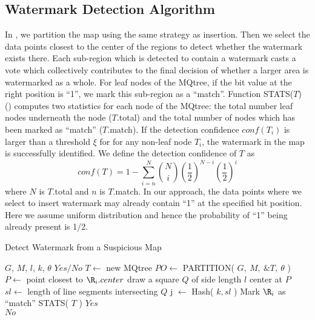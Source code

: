 \subsection{Watermark Detection Algorithm}

In , we partition the map %
using the same strategy as insertion. Then we select the data points closest
to the center of the regions to detect whether the watermark exists there.
Each sub-region which is detected to contain a watermark casts a vote
which collectively contributes to the final decision of whether a larger
area is watermarked as a whole.
For leaf nodes of the MQtree, if the bit value at the right position is ``1'', we mark 
this sub-region as a ``match''. 
Function STATS($T$) () computes two statistics for
each node of the MQtree: the total number leaf nodes underneath the node ($T$.total)
and the total number of nodes which has been marked as ``match'' ($T$.match).
If the detection confidence $conf(T_i)$ is larger than a threshold $\xi$ for
for any non-leaf node $T_i$, the watermark in the map is successfully identified.
We define the detection confidence of $T$ as
\begin{equation} \label{eqn:conf}
conf (T) =1 - \sum _{ i=n }^N{N \choose i}\left(\frac{1}{2}\right)^{ N-i} 
\left(\frac{1}{2}\right)^i 
\end{equation}
where $N$ is $T$.total and $n$ is $T$.match. 
In our approach, the data points where we select to insert watermark may
already contain ``1'' at the specified bit position. Here we assume uniform
distribution and hence the probability of ``1'' being already present is
1/2.
 
\begin{algorithm}[th]
\caption{Detect Watermark from a Suspicious Map}
\label{algo:Detection}
\begin{algorithmic}[1]
\Require $G$, $M$, $l$, $k$, $\theta$
\Ensure $Yes/No$
\State $T \leftarrow$ new MQtree
\State $PO \leftarrow$ PARTITION( $G,~M,~\&T,~\theta$ )
\State $P\leftarrow$ point closest to ${\R}_{i}.center$
\State draw a square $Q$ of side length $l$ center at $P$
\State $sl \leftarrow$ length of line segments intersecting $Q$
\State j $\leftarrow$ Hash( $k,sl$ )
\State Mark ${\R}_{i}$ as ``match''
\EndIf
\EndIf
\EndFor
\State STATS( $T$ )
\Return $Yes$
\EndIf
\EndFor\\
\Return $No$
\EndFunction
\end{algorithmic}
\end{algorithm}

